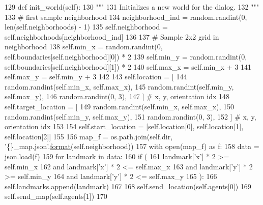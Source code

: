 \begin{DoxyCode}
129     \textcolor{keyword}{def }init\_world(self):
130         \textcolor{stringliteral}{"""}
131 \textcolor{stringliteral}{        Initializes a new world for the dialog.}
132 \textcolor{stringliteral}{        """}
133         \textcolor{comment}{# first sample neighborhood}
134         neighborhood\_ind = random.randint(0, len(self.neighborhoods) - 1)
135         self.neighborhood = self.neighborhoods[neighborhood\_ind]
136 
137         \textcolor{comment}{# Sample 2x2 grid in neighborhood}
138         self.min\_x = random.randint(0, self.boundaries[self.neighborhood][0]) * 2
139         self.min\_y = random.randint(0, self.boundaries[self.neighborhood][1]) * 2
140         self.max\_x = self.min\_x + 3
141         self.max\_y = self.min\_y + 3
142 
143         self.location = [
144             random.randint(self.min\_x, self.max\_x),
145             random.randint(self.min\_y, self.max\_y),
146             random.randint(0, 3),
147         ]  \textcolor{comment}{# x, y, orientation idx}
148         self.target\_location = [
149             random.randint(self.min\_x, self.max\_x),
150             random.randint(self.min\_y, self.max\_y),
151             random.randint(0, 3),
152         ]  \textcolor{comment}{# x, y, orientation idx}
153 
154         self.start\_location = [self.location[0], self.location[1], self.location[2]]
155 
156         map\_f = os.path.join(self.dir, \textcolor{stringliteral}{'\{\}\_map.json'}.\hyperlink{namespaceparlai_1_1chat__service_1_1services_1_1messenger_1_1shared__utils_a32e2e2022b824fbaf80c747160b52a76}{format}(self.neighborhood))
157         with open(map\_f) \textcolor{keyword}{as} f:
158             data = json.load(f)
159             \textcolor{keywordflow}{for} landmark \textcolor{keywordflow}{in} data:
160                 \textcolor{keywordflow}{if} (
161                     landmark[\textcolor{stringliteral}{'x'}] * 2 >= self.min\_x
162                     \textcolor{keywordflow}{and} landmark[\textcolor{stringliteral}{'x'}] * 2 <= self.max\_x
163                     \textcolor{keywordflow}{and} landmark[\textcolor{stringliteral}{'y'}] * 2 >= self.min\_y
164                     \textcolor{keywordflow}{and} landmark[\textcolor{stringliteral}{'y'}] * 2 <= self.max\_y
165                 ):
166                     self.landmarks.append(landmark)
167 
168         self.send\_location(self.agents[0])
169         self.send\_map(self.agents[1])
170 
\end{DoxyCode}
\mbox{\label{classparlai_1_1mturk_1_1tasks_1_1talkthewalk_1_1worlds_1_1TalkTheWalkWorld_a39aaaabf0760ced0c5d73f80ce196521}} 

